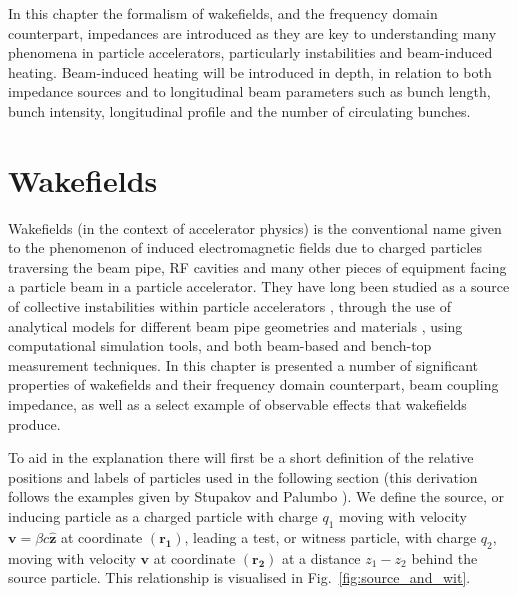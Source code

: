 In this chapter the formalism of wakefields, and the frequency domain counterpart, impedances are introduced as they are key to understanding many phenomena in particle accelerators, particularly instabilities and beam-induced heating. Beam-induced heating will be introduced in depth, in relation to both impedance sources and to longitudinal beam parameters such as bunch length, bunch intensity, longitudinal profile and the number of circulating bunches.

\section{Wakefields}

Wakefields (in the context of accelerator physics) is the conventional name given to the phenomenon of induced electromagnetic fields due to charged particles traversing the beam pipe, RF cavities and many other pieces of equipment facing a particle beam in a particle accelerator. They have long been studied as a source of collective instabilities within particle accelerators \cite{Laslett:ResWallInstab}, through the use of analytical models for different beam pipe geometries \cite{Stupakov:wakeandImp, Stupakov:surfaceRough, Stupakov:adInImpTheory} and materials \cite{Mounet:PhDThesis}, using computational simulation tools, and both beam-based and bench-top measurement techniques. In this chapter is presented a number of significant properties of wakefields and their frequency domain counterpart, beam coupling impedance, as well as a select example of observable effects that wakefields produce.

To aid in the explanation there will first be a short definition of the relative positions and labels of particles used in the following section (this derivation follows the examples given by Stupakov \cite{Stupakov:wakeandImp} and Palumbo \cite{Palumbo:Wakes}). We define the source, or inducing particle as a charged particle with charge $q_{1}$ moving with velocity $\mathbf{v} = \beta{}c \mathbf{\hat{z}}$ at coordinate $\left( \mathbf{r_{1}} \right)$, leading a test, or witness particle, with charge $q_{2}$, moving with velocity $\mathbf{v}$ at coordinate $\left( \mathbf{r_{2}} \right)$ at a distance $z_{1} - z_{2}$ behind the source particle. This relationship is visualised in Fig.~\ref{fig:source_and_wit}.

